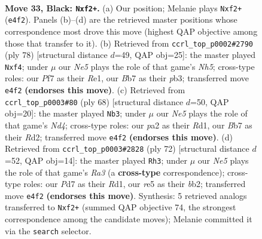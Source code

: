 \documentclass[11pt]{article}
\begin{document}
\clearpage

\begin{figure}[p]\centering
\begin{subfigure}{0.46\textwidth}\centering
\resizebox{\linewidth}{!}{%
\newchessgame
\chessboard[
  setfen={1r1r4/pb1p1pk1/8/4R3/4n1P1/8/PP3P2/2BK1BR1 b - - 0 33},
  showmover=false,
  pgfstyle=straightmove, color=movearrow, markmove={e4-f2}
]}
\caption{}
\end{subfigure}\hfill
\begin{subfigure}{0.46\textwidth}\centering
\resizebox{\linewidth}{!}{%
\newchessgame
\chessboard[
  setfen={5rk1/p7/1p4b1/7N/3P1bP1/Pp6/8/R3R1K1 w - - 0 40},
  showmover=false,
  pgfstyle=straightmove, color=movearrow, markmove={h5-f4}
]}
\caption{}
\end{subfigure}
\\[4pt]
\begin{subfigure}{0.46\textwidth}\centering
\resizebox{\linewidth}{!}{%
\newchessgame
\chessboard[
  setfen={r5k1/6p1/1p5p/2b1r3/3N3P/6P1/3R1P2/3R1K2 w - - 0 35},
  showmover=false,
  pgfstyle=straightmove, color=movearrow, markmove={d4-b3}
]}
\caption{}
\end{subfigure}\hfill
\begin{subfigure}{0.46\textwidth}\centering
\resizebox{\linewidth}{!}{%
\newchessgame
\chessboard[
  setfen={r5k1/7p/b4r2/1NpP4/P5P1/R7/1b4B1/3R3K w - - 0 37},
  showmover=false,
  pgfstyle=straightmove, color=movearrow, markmove={a3-h3}
]}
\caption{}
\end{subfigure}
\caption{\textbf{Move 33, Black: \texttt{Nxf2+}.} (a) Our position; Melanie plays \texttt{Nxf2+} (\texttt{e4f2}). Panels (b)--(d) are the retrieved master positions whose correspondence most drove this move (highest QAP objective among those that transfer to it). (b) Retrieved from \texttt{ccrl\_top\_p0002\#2790} (ply 78) [structural distance $d$=49, QAP obj=25]: the master played \texttt{Nxf4}; under $\mu$ our \emph{Ne5} plays the role of that game's \emph{Nh5}; cross-type roles: our \emph{P}f7 as their \emph{R}e1, our \emph{B}b7 as their \emph{p}b3; transferred move \texttt{e4f2} \textbf{(endorses this move)}. (c) Retrieved from \texttt{ccrl\_top\_p0003\#80} (ply 68) [structural distance $d$=50, QAP obj=20]: the master played \texttt{Nb3}; under $\mu$ our \emph{Ne5} plays the role of that game's \emph{Nd4}; cross-type roles: our \emph{p}a2 as their \emph{R}d1, our \emph{B}b7 as their \emph{R}d2; transferred move \texttt{e4f2} \textbf{(endorses this move)}. (d) Retrieved from \texttt{ccrl\_top\_p0003\#2828} (ply 72) [structural distance $d$=52, QAP obj=14]: the master played \texttt{Rh3}; under $\mu$ our \emph{Ne5} plays the role of that game's \emph{Ra3} (a \textbf{cross-type} correspondence); cross-type roles: our \emph{P}d7 as their \emph{R}d1, our \emph{r}e5 as their \emph{b}b2; transferred move \texttt{e4f2} \textbf{(endorses this move)}. Synthesis: 5 retrieved analogs transferred to \texttt{Nxf2+} (summed QAP objective 74, the strongest correspondence among the candidate moves); Melanie committed it via the \texttt{search} selector.}
\label{fig:thought-m65}
\end{figure}
\end{document}
